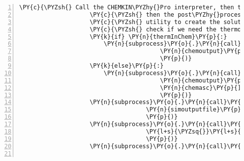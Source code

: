 \begin{Verbatim}[commandchars=\\\{\},fontsize=\small,numbers=left,firstnumber=1,stepnumber=2,firstline=2]
                    \PY{c}{\PYZsh{} Call the CHEMKIN\PYZhy{}Pro interpreter, then the solver,}
                    \PY{c}{\PYZsh{} then the post\PYZhy{}processor, then the transpose}
                    \PY{c}{\PYZsh{} utility to create the solution .csv files. First}
                    \PY{c}{\PYZsh{} check if we need the thermo file.}
                    \PY{k}{if} \PY{n}{thermInChem}\PY{p}{:}
                        \PY{n}{subprocess}\PY{o}{.}\PY{n}{call}\PY{p}{(}\PY{p}{[}\PY{n}{ckinterp}\PY{p}{,} \PY{l+s}{\PYZsq{}}\PY{l+s}{\PYZhy{}i}\PY{l+s}{\PYZsq{}}\PY{p}{,} \PY{n}{chemfilename}\PY{p}{,} \PY{l+s}{\PYZsq{}}\PY{l+s}{\PYZhy{}o}\PY{l+s}{\PYZsq{}}\PY{p}{,}
                                        \PY{n}{chemoutput}\PY{p}{,} \PY{l+s}{\PYZsq{}}\PY{l+s}{\PYZhy{}c}\PY{l+s}{\PYZsq{}}\PY{p}{,} \PY{n}{chemasc}\PY{p}{]}
                                        \PY{p}{)}
                    \PY{k}{else}\PY{p}{:}
                        \PY{n}{subprocess}\PY{o}{.}\PY{n}{call}\PY{p}{(}\PY{p}{[}\PY{n}{ckinterp}\PY{p}{,} \PY{l+s}{\PYZsq{}}\PY{l+s}{\PYZhy{}i}\PY{l+s}{\PYZsq{}}\PY{p}{,} \PY{n}{chemfilename}\PY{p}{,} \PY{l+s}{\PYZsq{}}\PY{l+s}{\PYZhy{}o}\PY{l+s}{\PYZsq{}}\PY{p}{,}
                                        \PY{n}{chemoutput}\PY{p}{,} \PY{l+s}{\PYZsq{}}\PY{l+s}{\PYZhy{}d}\PY{l+s}{\PYZsq{}}\PY{p}{,} \PY{n}{thermfilename}\PY{p}{,} \PY{l+s}{\PYZsq{}}\PY{l+s}{\PYZhy{}c}\PY{l+s}{\PYZsq{}}\PY{p}{,}
                                        \PY{n}{chemasc}\PY{p}{]}
                                        \PY{p}{)}
                    \PY{n}{subprocess}\PY{o}{.}\PY{n}{call}\PY{p}{(}\PY{p}{[}\PY{n}{reactor}\PY{p}{,} \PY{l+s}{\PYZsq{}}\PY{l+s}{\PYZhy{}i}\PY{l+s}{\PYZsq{}}\PY{p}{,}\PY{n}{inpfile}\PY{p}{,} \PY{l+s}{\PYZsq{}}\PY{l+s}{\PYZhy{}o}\PY{l+s}{\PYZsq{}}\PY{p}{,}
                                    \PY{n}{simoutputfile}\PY{p}{,} \PY{l+s}{\PYZsq{}}\PY{l+s}{Pro}\PY{l+s}{\PYZsq{}}\PY{p}{,} \PY{l+s}{\PYZsq{}}\PY{l+s}{\PYZhy{}c}\PY{l+s}{\PYZsq{}}\PY{p}{,} \PY{n}{chemasc}\PY{p}{]}
                                    \PY{p}{)}
                    \PY{n}{subprocess}\PY{o}{.}\PY{n}{call}\PY{p}{(}\PY{p}{[}\PY{l+s}{\PYZsq{}}\PY{l+s}{GetSolution}\PY{l+s}{\PYZsq{}}\PY{p}{,} \PY{l+s}{\PYZsq{}}\PY{l+s}{CKSolnList.txt}\PY{l+s}{\PYZsq{}}\PY{p}{,}
                                    \PY{l+s}{\PYZsq{}}\PY{l+s}{XMLdata.zip}\PY{l+s}{\PYZsq{}}\PY{p}{]}
                                    \PY{p}{)}
                    \PY{n}{subprocess}\PY{o}{.}\PY{n}{call}\PY{p}{(}\PY{p}{[}\PY{l+s}{\PYZsq{}}\PY{l+s}{CKSolnTranspose}\PY{l+s}{\PYZsq{}}\PY{p}{]}\PY{p}{)}


\end{Verbatim}
